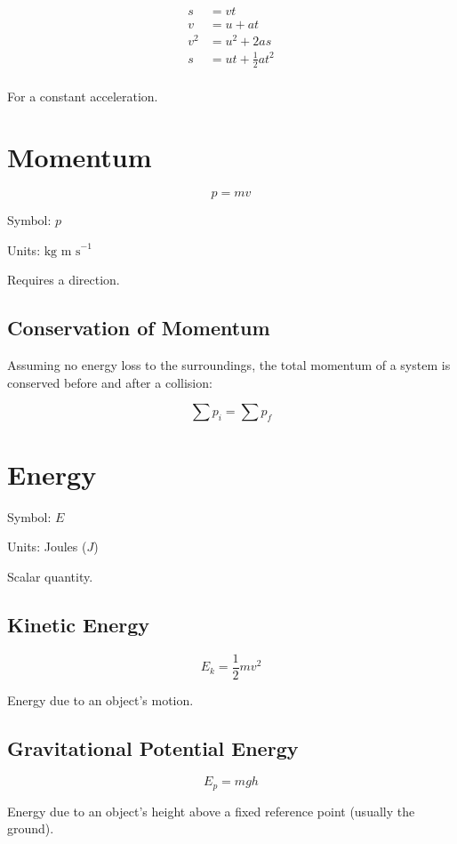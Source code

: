 \documentclass[a4paper,11pt]{article}
\begin{document}
$$
\begin{aligned}
s & = vt \\
v & = u + at \\
v^2 & = u^2 + 2as \\
s & = ut + \frac{1}{2}at^2 \\
\end{aligned}
$$

For a constant acceleration.




\section{Momentum}

$$
p = mv
$$

Symbol: $p$

Units: $\mbox{kg m s}^{-1}$

Requires a direction.


\subsection{Conservation of Momentum}

Assuming no energy loss to the surroundings, the total momentum of a system is
conserved before and after a collision:

$$
\sum p_i = \sum p_f
$$




\section{Energy}

Symbol: $E$

Units: Joules ($J$)

Scalar quantity.


\subsection{Kinetic Energy}

$$
E_k = \frac{1}{2}mv^2
$$

Energy due to an object's motion.


\subsection{Gravitational Potential Energy}

$$
E_p = mgh
$$

Energy due to an object's height above a fixed reference point (usually the
ground).
\end{document}
